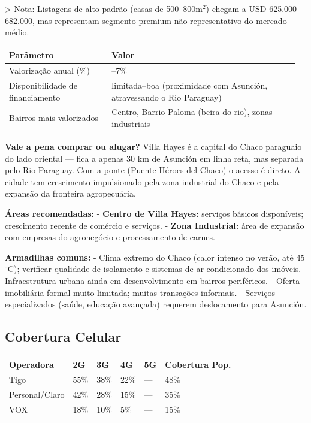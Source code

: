 > Nota: Listagens de alto padrão (casas de 500--800m$^2$) chegam a USD 625.000--682.000, mas representam segmento premium não representativo do mercado médio.


{\small
\setlength{\tabcolsep}{3pt}
\renewcommand{\arraystretch}{1.12}
\begin{tabularx}{\linewidth}{>{\raggedright\arraybackslash}p{0.34\linewidth} >{\raggedright\arraybackslash}p{0.62\linewidth}}
\toprule
Parâmetro & Valor \\
\midrule
Valorização anual (\%) & 5--7\% \\
Disponibilidade de financiamento & limitada--boa (proximidade com Asunción, atravessando o Rio Paraguay) \\
Bairros mais valorizados & Centro, Barrio Paloma (beira do rio), zonas industriais \\
\bottomrule
\end{tabularx}
}


\textbf{Vale a pena comprar ou alugar?}
Villa Hayes é a capital do Chaco paraguaio do lado oriental --- fica a apenas 30 km de Asunción em linha reta, mas separada pelo Rio Paraguay. Com a ponte (Puente Héroes del Chaco) o acesso é direto. A cidade tem crescimento impulsionado pela zona industrial do Chaco e pela expansão da fronteira agropecuária.

\textbf{Áreas recomendadas:}
- \textbf{Centro de Villa Hayes:} serviços básicos disponíveis; crescimento recente de comércio e serviços.
- \textbf{Zona Industrial:} área de expansão com empresas do agronegócio e processamento de carnes.

\textbf{Armadilhas comuns:}
- Clima extremo do Chaco (calor intenso no verão, até 45$^\circ$C); verificar qualidade de isolamento e sistemas de ar-condicionado dos imóveis.
- Infraestrutura urbana ainda em desenvolvimento em bairros periféricos.
- Oferta imobiliária formal muito limitada; muitas transações informais.
- Serviços especializados (saúde, educação avançada) requerem deslocamento para Asunción.




\subsection{Cobertura Celular}



{\small
\setlength{\tabcolsep}{3pt}
\renewcommand{\arraystretch}{1.12}
{\small
\begin{tabularx}{\linewidth}{lXXXXX}
\toprule
Operadora & 2G & 3G & 4G & 5G & Cobertura Pop. \\
\midrule
Tigo & 55\% & 38\% & 22\% & --- & 48\% \\
Personal/Claro & 42\% & 28\% & 15\% & --- & 35\% \\
VOX & 18\% & 10\% & 5\% & --- & 15\% \\
\bottomrule
\end{tabularx}
}
}

